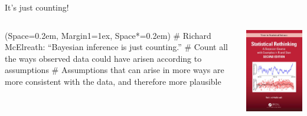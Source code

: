 \documentclass[12pt, aspectratio=149]{beamer}
\newcommand{\listSpace}{0.2em}
\theoremstyle{plain}
\begin{document}
\begin{frame}[fragile]{It's just counting!}
	\begin{columns}
		\begin{column}{0.7\linewidth}
			\begin{easylist}[itemize]
					\ListProperties(Space=\listSpace, Margin1=1ex, Space*=\listSpace)
					# Richard McElreath: ``Bayesian inference is just counting.''  
					# Count all the ways observed data could have arisen according to assumptions
					# Assumptions that can arise in more ways are more consistent with the data, and therefore more plausible
			\end{easylist}
		\end{column}
	\begin{column}{0.3\textwidth}
		\includegraphics[height=0.7\textheight]{figs/rethinking3.jpg}
	\end{column}
	\end{columns}
\end{frame}
\end{document}
